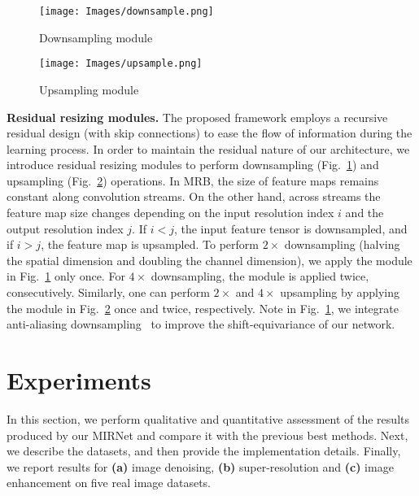 \documentclass[runningheads]{llncs}
\begin{document}
\begin{figure*}[t]
\centering
    \begin{subfigure}[t]{0.49\textwidth}
      \texttt{[image: Images/downsample.png]}
      \caption{\small Downsampling module}
      \label{fig:downsample}
    \end{subfigure}
    \begin{subfigure}[t]{0.49\textwidth}
      \texttt{[image: Images/upsample.png]}
      \caption{\small Upsampling module}
      \label{fig:upsample}
    \end{subfigure}
\vspace{-3mm}
\caption{\small Residual resizing modules to perform downsampling and upsampling. }
\vspace{-1.5em}
\end{figure*}



\vspace{0.2em} \noindent \textbf{Residual resizing modules.}
The proposed framework employs a recursive residual design (with skip connections) to ease the flow of information during the learning process. In order to maintain the residual nature of our architecture, we introduce residual resizing modules to perform downsampling (Fig.~\ref{fig:downsample}) and upsampling (Fig.~\ref{fig:upsample}) operations.   
In MRB, the size of feature maps remains constant along convolution streams.
On the other hand, across streams the feature map size changes depending on the input resolution index $i$ and the output resolution index $j$.
If $i<j$, the input feature tensor is downsampled, and if $i>j$, the feature map is upsampled.
To perform $2\times$ downsampling (halving the spatial dimension and doubling the channel dimension), we apply the module in Fig.~\ref{fig:downsample} only once. For $4\times$ downsampling, the module is applied twice, consecutively.
Similarly, one can perform $2\times$ and $4\times$ upsampling by applying the module in Fig.~\ref{fig:upsample} once and twice, respectively. 
Note in Fig.~\ref{fig:downsample}, we integrate anti-aliasing downsampling~\cite{zhang2019making} to improve the shift-equivariance of our network. 





\section{Experiments}
In this section, we perform qualitative and quantitative assessment of the results produced by our MIRNet and compare it with the previous best methods. 
Next, we describe the datasets, and then provide the implementation details. Finally, we report results for \textbf{(a)} image denoising, \textbf{(b)} super-resolution and \textbf{(c)} image enhancement on five real image datasets. 
\end{document}
